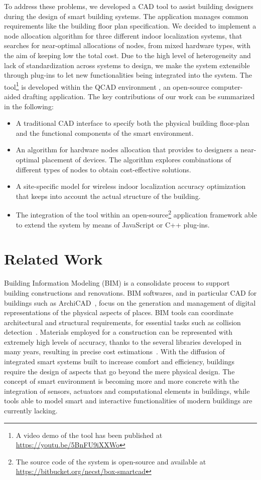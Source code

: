 To address these problems, we developed a CAD tool to assist building designers during the design of smart building systems.
The application manages common requirements like the building floor plan specification. We decided to implement a node allocation algorithm for three different indoor localization systems, that searches for  near-optimal 
allocations of nodes, from mixed hardware types, with the aim of keeping low the total cost. Due to the high level of heterogeneity and lack of standardization across systems to design, we make the system extensible through plug-ins to let new functionalities being integrated into the system.
The tool\footnote{A video demo of the tool has been published at \url{https://youtu.be/5BnFU9iXXWo}}
is developed within the QCAD environment \cite{Qcad}, an \mbox{open-source} computer-aided drafting application. The key contributions of our work can be summarized in the following:
\begin{itemize}
\item A traditional CAD interface to specify both the physical building floor-plan and the functional components of the smart environment.
\item An algorithm for hardware nodes allocation that provides to designers a near-optimal placement of devices. The algorithm explores combinations of different types of nodes to obtain cost-effective solutions.
\item A site-specific model for wireless indoor localization accuracy optimization that keeps into account the actual structure of the building.
\item The integration of the tool within an \mbox{open-source}\footnote{The source code of the system is \mbox{open-source} and available at \url{https://bitbucket.org/necst/box-smartcad}} application framework able to extend the system by means of JavaScript or C++ plug-ins.
\end{itemize}

\section{Related Work}\label{sec:related}
Building Information Modeling (BIM) is a consolidate process to support building constructions and renovations. BIM softwares, and in particular CAD for buildings such as ArchiCAD~\cite{Archicad}, focus on the generation and management of digital representations of the physical aspects of places. BIM tools can coordinate architectural and structural requirements, for essential tasks such as collision detection~\cite{Zhang2011}. Materials employed for a construction can be represented with extremely high levels of accuracy, thanks to the several libraries developed in many years, resulting in precise cost estimations~\cite{Xu2014}. With the diffusion of integrated smart systems built to increase comfort and efficiency, buildings require the design of aspects that go beyond the mere physical design. The concept of smart environment is becoming more and more concrete with the integration of sensors, actuators and computational elements in buildings, while tools able to model smart and interactive functionalities of modern buildings are currently lacking.

